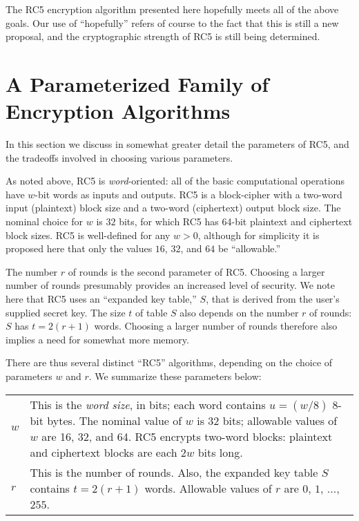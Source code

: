 The RC5 encryption algorithm presented here hopefully meets all of the
above goals.  Our use of ``hopefully'' refers of course to the fact
that this is still a new proposal, and the cryptographic strength of
RC5 is still being determined.


\section{A Parameterized Family of Encryption Algorithms}

In this section we discuss in somewhat greater detail the parameters
of RC5, and the tradeoffs involved in choosing various parameters.

As noted above, RC5 is {\em word}-oriented: all of the basic computational
operations have $w$-bit words as inputs and outputs.  RC5 is
a block-cipher with a two-word input (plaintext) block size and a
two-word (ciphertext) output block size.
The nominal choice for $w$ is $32$ bits, for which RC5 has
64-bit plaintext and ciphertext block sizes.
RC5 is well-defined for any $w>0$, although for simplicity it is proposed
here that only the values $16$, $32$, and $64$ be ``allowable.''

The number $r$ of rounds is the second parameter of RC5.  Choosing a
larger number of rounds presumably provides an increased level of
security.  We note here that RC5 uses an ``expanded key table,'' $S$,
that is derived from the user's supplied secret key.  The size $t$ of
table $S$ also depends on the number $r$ of rounds: $S$ has $t=2(r+1)$
words.  Choosing a larger number of rounds therefore also implies a
need for somewhat more memory.

There are thus several distinct ``RC5'' algorithms, depending on the choice of
parameters $w$ and $r$.  We summarize these parameters below:

\smallskip
\renewcommand{\arraystretch}{1.5}
\begin{tabular}{ll} 
$w$ & \parbox[t]{4.43in}{This is the {\em word size},  in bits;
                      each word contains $u=(w/8)$ 8-bit bytes.
                      The nominal value of $w$ is 32 bits;
		      allowable values of $w$ are 16, 32, and 64.
                      RC5 encrypts two-word blocks: plaintext and
                      ciphertext blocks are each $2w$  bits long.
}\\
$r$ &\parbox[t]{4.43in}{This is the number of rounds.  
                     Also, the expanded key table $S$ contains 
                     $t=2(r+1)$ words.
                     Allowable values of  $r$  are  
		     $0$, $1$, ..., $255$.}\\
\end{tabular}
\smallskip


